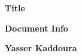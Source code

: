 \documentclass[12pt]{article}
\newcommand{\documentTitle}{Title}
\newcommand{\documentType}{Document Info}
\begin{document}
\begin{titlepage}
    \begin{center}
        \vspace*{1cm}

        \LARGE
        \textbf{\documentTitle}

        \vspace{0.5cm}

        \normalsize
        \textbf{\documentType}

        \vspace{1.5cm}

        \large
        \textbf{Yasser Kaddoura}

        \vfill
    \end{center}
\end{titlepage}
\end{document}
